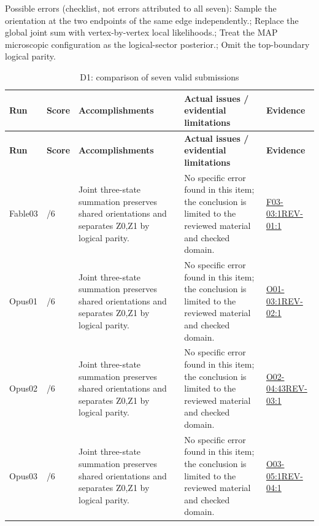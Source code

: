 \documentclass[11pt,a4paper]{article}
\begin{document}
Possible errors (checklist,\allowbreak{} not errors attributed to all seven): Sample the orientation at the two endpoints of the same edge independently.; Replace the global joint sum with vertex-by-vertex local likelihoods.; Treat the MAP microscopic configuration as the logical-sector posterior.; Omit the top-boundary logical parity.

{\fontsize{9.0}{12.6}\selectfont
\setlength{\tabcolsep}{2.5pt}
\begin{longtable}{>{\raggedright\arraybackslash}p{}>{\raggedright\arraybackslash}p{}>{\raggedright\arraybackslash}p{}>{\raggedright\arraybackslash}p{}>{\raggedright\arraybackslash}p{}}
\caption{D1: comparison of seven valid submissions}\\
\toprule
\textbf{Run} & \textbf{Score} & \textbf{Accomplishments} & \textbf{Actual issues /\allowbreak{} evidential limitations} & \textbf{Evidence}\tabularnewline
\midrule
\endfirsthead
\toprule
\textbf{Run} & \textbf{Score} & \textbf{Accomplishments} & \textbf{Actual issues /\allowbreak{} evidential limitations} & \textbf{Evidence}\tabularnewline
\midrule
\endhead
{}Fable03 & 6/\allowbreak{}6 & Joint three-state summation preserves shared orientations and separates Z0,\allowbreak{}Z1 by logical parity. & No specific error found in this item; the conclusion is limited to the reviewed material and checked domain. & \hyperref[src:F03-03]{F03-03:1}\newline \hyperref[src:REV-01]{REV-01:1}\tabularnewline
{}Opus01 & 6/\allowbreak{}6 & Joint three-state summation preserves shared orientations and separates Z0,\allowbreak{}Z1 by logical parity. & No specific error found in this item; the conclusion is limited to the reviewed material and checked domain. & \hyperref[src:O01-03]{O01-03:1}\newline \hyperref[src:REV-02]{REV-02:1}\tabularnewline
{}Opus02 & 6/\allowbreak{}6 & Joint three-state summation preserves shared orientations and separates Z0,\allowbreak{}Z1 by logical parity. & No specific error found in this item; the conclusion is limited to the reviewed material and checked domain. & \hyperref[src:O02-04]{O02-04:43}\newline \hyperref[src:REV-03]{REV-03:1}\tabularnewline
{}Opus03 & 6/\allowbreak{}6 & Joint three-state summation preserves shared orientations and separates Z0,\allowbreak{}Z1 by logical parity. & No specific error found in this item; the conclusion is limited to the reviewed material and checked domain. & \hyperref[src:O03-05]{O03-05:1}\newline \hyperref[src:REV-04]{REV-04:1}\tabularnewline

\end{longtable}}
\end{document}
